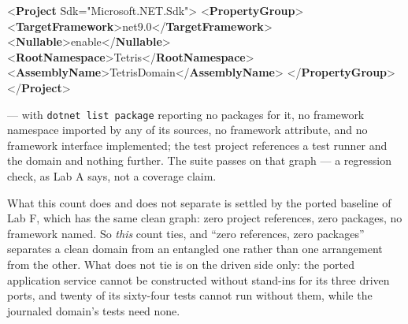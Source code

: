 \documentclass[
]{article}
\newenvironment{Shaded}{}{}
\newcommand{\KeywordTok}[1]{\textcolor[rgb]{0.00,0.44,0.13}{\textbf{#1}}}
\newcommand{\NormalTok}[1]{#1}
\newcommand{\OtherTok}[1]{\textcolor[rgb]{0.00,0.44,0.13}{#1}}
\newcommand{\StringTok}[1]{\textcolor[rgb]{0.25,0.44,0.63}{#1}}
\newcounter{none} %
\begin{document}
\begin{Shaded}
\begin{Highlighting}[]
\NormalTok{\textless{}}\KeywordTok{Project} \OtherTok{Sdk=}\StringTok{"Microsoft.NET.Sdk"}\NormalTok{\textgreater{}}
\NormalTok{  \textless{}}\KeywordTok{PropertyGroup}\NormalTok{\textgreater{}}
\NormalTok{    \textless{}}\KeywordTok{TargetFramework}\NormalTok{\textgreater{}net9.0\textless{}/}\KeywordTok{TargetFramework}\NormalTok{\textgreater{}}
\NormalTok{    \textless{}}\KeywordTok{Nullable}\NormalTok{\textgreater{}enable\textless{}/}\KeywordTok{Nullable}\NormalTok{\textgreater{}}
\NormalTok{    \textless{}}\KeywordTok{RootNamespace}\NormalTok{\textgreater{}Tetris\textless{}/}\KeywordTok{RootNamespace}\NormalTok{\textgreater{}}
\NormalTok{    \textless{}}\KeywordTok{AssemblyName}\NormalTok{\textgreater{}TetrisDomain\textless{}/}\KeywordTok{AssemblyName}\NormalTok{\textgreater{}}
\NormalTok{  \textless{}/}\KeywordTok{PropertyGroup}\NormalTok{\textgreater{}}
\NormalTok{\textless{}/}\KeywordTok{Project}\NormalTok{\textgreater{}}
\end{Highlighting}
\end{Shaded}

--- with \texttt{dotnet\ list\ package} reporting no packages for it, no
framework namespace imported by any of its sources, no framework
attribute, and no framework interface implemented; the test project
references a test runner and the domain and nothing further. The suite
passes on that graph --- a regression check, as Lab A says, not a
coverage claim.

What this count does and does not separate is settled by the ported
baseline of Lab F, which has the same clean graph: zero project
references, zero packages, no framework named. So \emph{this} count
ties, and ``zero references, zero packages'' separates a clean domain
from an entangled one rather than one arrangement from the other. What
does not tie is on the driven side only: the ported application service
cannot be constructed without stand-ins for its three driven ports, and
twenty of its sixty-four tests cannot run without them, while the
journaled domain's tests need none.
\end{document}
